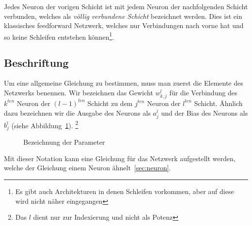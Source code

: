 \documentclass[12pt,a4paper]{report}
\begin{document}
Jedes Neuron der vorigen Schicht ist mit jedem Neuron der nachfolgenden Schicht verbunden,
welches als \textit{völlig verbundene Schicht} bezeichnet werden.
Dies ist ein klassisches feedforward Netzwerk,
welches nur Verbindungen nach vorne hat und so keine Schleifen entstehen können\footnote{Es gibt auch Architekturen in denen Schleifen vorkommen,
aber auf diese wird nicht näher eingegangen}.

\subsection{Beschriftung}

Um eine allgemeine Gleichung zu bestimmen, muss man zuerst die Elemente des Netzwerks benennen.
Wir bezeichnen das Gewicht $w^l_{k,j}$ für die Verbindung des $k^{ten}$ Neuron der $(l-1)^{ten}$ Schicht
zu dem $j^{ten}$ Neuron der $l^{ten}$ Schicht.
Ähnlich dazu bezeichnen wir die Ausgabe des Neurons als $a^l_j$ und der Bias des Neurons als $b^l_j$ (siehe Abbildung~\ref{fig:network3}).
\footnote{Das $l$ dient nur zur Indexierung und nicht als Potenz}

\begin{figure}[h]
    \centering
{}
    \caption{Bezeichnung der Parameter}
    \label{fig:network3}
\end{figure}
Mit dieser Notation kann eine Gleichung für das Netzwerk aufgestellt werden, welche der Gleichung einem Neuron ähnelt~\ref{sec:neuron}.
\end{document}
